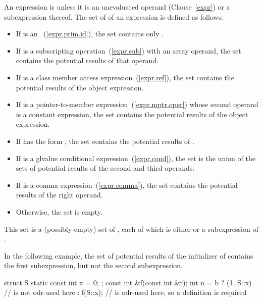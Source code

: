 \pnum
An expression is  unless it is an
unevaluated operand (Clause~\ref{expr}) or a subexpression thereof.
The set of  of an expression  is
defined as follows:
\begin{itemize}
\item If  is an
~(\ref{expr.prim.id}), the set
contains only .
\item If  is a subscripting operation~(\ref{expr.sub}) with
an array operand, the set contains the potential results of that operand.
\item If  is a class member access
expression~(\ref{expr.ref}), the set contains the potential results of
the object expression.
\item If  is a pointer-to-member
expression~(\ref{expr.mptr.oper}) whose second operand is a constant
expression, the set contains the potential results of the object
expression.
\item If  has the form , the set contains the
potential results of .
\item If  is a glvalue conditional
expression~(\ref{expr.cond}), the set is the union of the sets of
potential results of the second and third operands.
\item If  is a comma expression~(\ref{expr.comma}), the set
contains the potential results of the right operand.
\item Otherwise, the set is empty.
\end{itemize}
\begin{note}
This set is a (possibly-empty) set of ,
each of which is either  or a subexpression of .
\begin{example}
In the following example, the set of potential results of the initializer
of  contains the first  subexpression, but not the second
 subexpression.
\begin{codeblock}
struct S { static const int x = 0; };
const int &f(const int &r);
int n = b ? (1, S::x)  //  is not odr-used here
          : f(S::x);   //  is odr-used here, so a definition is required
\end{codeblock}
\end{example}
\end{note}

